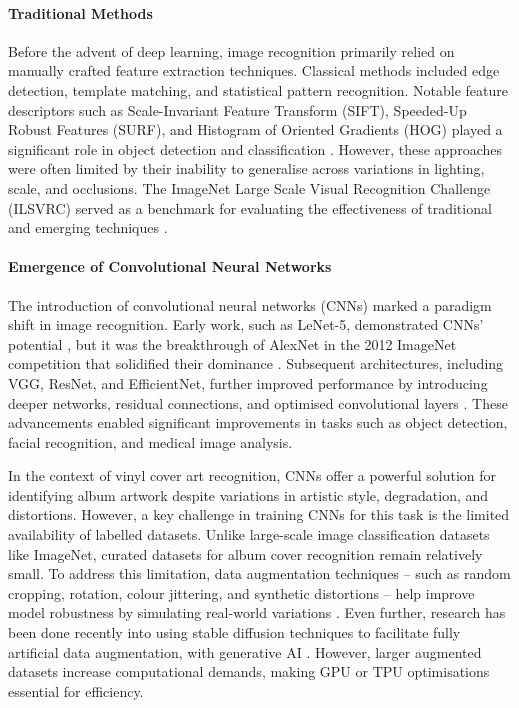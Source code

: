             \paragraph{Traditional Methods}
            
                Before the advent of deep learning, image recognition primarily relied on manually crafted feature extraction techniques. Classical methods included edge detection, template matching, and statistical pattern recognition. Notable feature descriptors such as Scale-Invariant Feature Transform (SIFT), Speeded-Up Robust Features (SURF), and Histogram of Oriented Gradients (HOG) played a significant role in object detection and classification \cite{pal2001pattern}. However, these approaches were often limited by their inability to generalise across variations in lighting, scale, and occlusions. The ImageNet Large Scale Visual Recognition Challenge (ILSVRC) served as a benchmark for evaluating the effectiveness of traditional and emerging techniques \cite{russakovsky2015imagenetlargescalevisual}.
            
            \paragraph{Emergence of Convolutional Neural Networks}
            
                The introduction of convolutional neural networks (CNNs) marked a paradigm shift in image recognition. Early work, such as LeNet-5, demonstrated CNNs' potential \cite{726791}, but it was the breakthrough of AlexNet in the 2012 ImageNet competition that solidified their dominance \cite{imagenetclasscnn}. Subsequent architectures, including VGG, ResNet, and EfficientNet, further improved performance by introducing deeper networks, residual connections, and optimised convolutional layers \cite{deppcnnsforimagerecognition}. These advancements enabled significant improvements in tasks such as object detection, facial recognition, and medical image analysis.
    
                In the context of vinyl cover art recognition, CNNs offer a powerful solution for identifying album artwork despite variations in artistic style, degradation, and distortions. However, a key challenge in training CNNs for this task is the limited availability of labelled datasets. Unlike large-scale image classification datasets like ImageNet, curated datasets for album cover recognition remain relatively small. To address this limitation, data augmentation techniques -- such as random cropping, rotation, colour jittering, and synthetic distortions -- help improve model robustness by simulating real-world variations \cite{LIN2025102660}. Even further, research has been done recently into using stable diffusion techniques to facilitate fully artificial data augmentation, with generative AI \cite{Alimisis2025}. However, larger augmented datasets increase computational demands, making GPU or TPU optimisations essential for efficiency.
    
